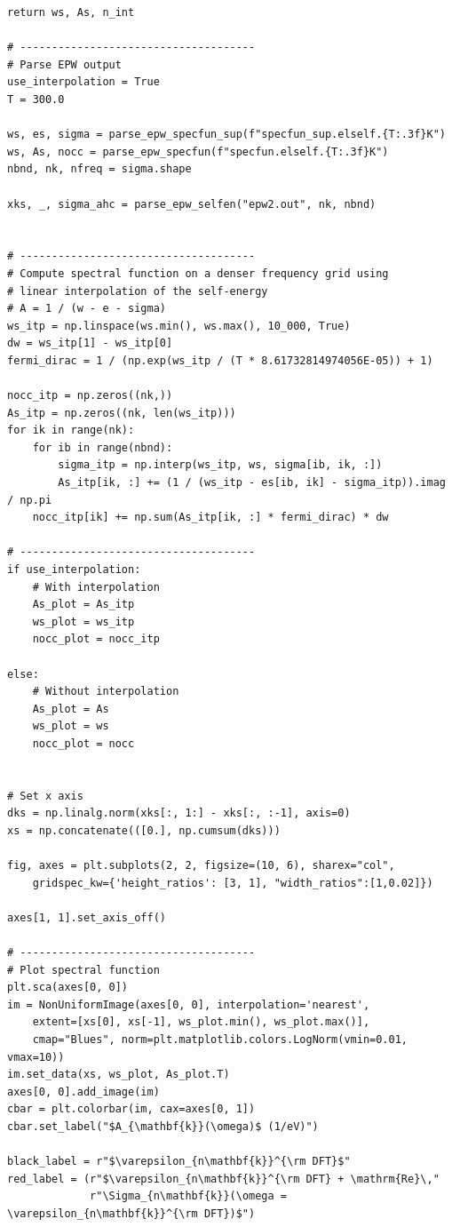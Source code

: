 \documentclass[a4paper,11pt,serif]{article}
\begin{document}
\begin{scriptsize}
\begin{Verbatim}[frame=single]
    return ws, As, n_int

# -------------------------------------
# Parse EPW output
use_interpolation = True
T = 300.0

ws, es, sigma = parse_epw_specfun_sup(f"specfun_sup.elself.{T:.3f}K")
ws, As, nocc = parse_epw_specfun(f"specfun.elself.{T:.3f}K")
nbnd, nk, nfreq = sigma.shape

xks, _, sigma_ahc = parse_epw_selfen("epw2.out", nk, nbnd)


# -------------------------------------
# Compute spectral function on a denser frequency grid using
# linear interpolation of the self-energy
# A = 1 / (w - e - sigma)
ws_itp = np.linspace(ws.min(), ws.max(), 10_000, True)
dw = ws_itp[1] - ws_itp[0]
fermi_dirac = 1 / (np.exp(ws_itp / (T * 8.61732814974056E-05)) + 1)

nocc_itp = np.zeros((nk,))
As_itp = np.zeros((nk, len(ws_itp)))
for ik in range(nk):
    for ib in range(nbnd):
        sigma_itp = np.interp(ws_itp, ws, sigma[ib, ik, :])
        As_itp[ik, :] += (1 / (ws_itp - es[ib, ik] - sigma_itp)).imag / np.pi
    nocc_itp[ik] += np.sum(As_itp[ik, :] * fermi_dirac) * dw

# -------------------------------------
if use_interpolation:
    # With interpolation
    As_plot = As_itp
    ws_plot = ws_itp
    nocc_plot = nocc_itp

else:
    # Without interpolation
    As_plot = As
    ws_plot = ws
    nocc_plot = nocc


# Set x axis
dks = np.linalg.norm(xks[:, 1:] - xks[:, :-1], axis=0)
xs = np.concatenate(([0.], np.cumsum(dks)))

fig, axes = plt.subplots(2, 2, figsize=(10, 6), sharex="col",
    gridspec_kw={'height_ratios': [3, 1], "width_ratios":[1,0.02]})

axes[1, 1].set_axis_off()

# -------------------------------------
# Plot spectral function
plt.sca(axes[0, 0])
im = NonUniformImage(axes[0, 0], interpolation='nearest',
    extent=[xs[0], xs[-1], ws_plot.min(), ws_plot.max()],
    cmap="Blues", norm=plt.matplotlib.colors.LogNorm(vmin=0.01, vmax=10))
im.set_data(xs, ws_plot, As_plot.T)
axes[0, 0].add_image(im)
cbar = plt.colorbar(im, cax=axes[0, 1])
cbar.set_label("$A_{\mathbf{k}}(\omega)$ (1/eV)")

black_label = r"$\varepsilon_{n\mathbf{k}}^{\rm DFT}$"
red_label = (r"$\varepsilon_{n\mathbf{k}}^{\rm DFT} + \mathrm{Re}\,"
             r"\Sigma_{n\mathbf{k}}(\omega = \varepsilon_{n\mathbf{k}}^{\rm DFT})$")


\end{Verbatim}
\end{scriptsize}
\end{document}
